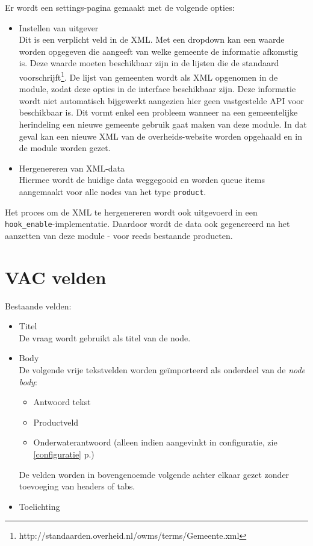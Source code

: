 \documentclass[12pt]{article}
\newcommand{\seeonec}[1]{, zie \ref{#1} p.\pageref{#1}}
\begin{document}
Er wordt een settings-pagina gemaakt met de volgende opties:
\begin{itemize}
\item Instellen van uitgever \\
Dit is een verplicht veld in de XML. Met een dropdown kan een waarde worden opgegeven die aangeeft van welke gemeente de informatie afkomstig is. Deze waarde moeten beschikbaar zijn in de lijsten die de standaard voorschrijft\footnote{http://standaarden.overheid.nl/owms/terms/Gemeente.xml}. De lijst van gemeenten wordt als XML opgenomen in de module, zodat deze opties in de interface beschikbaar zijn. Deze informatie wordt niet automatisch bijgewerkt aangezien hier geen vastgestelde API voor beschikbaar is. Dit vormt enkel een probleem wanneer na een gemeentelijke herindeling een nieuwe gemeente gebruik gaat maken van deze module. In dat geval kan een nieuwe XML van de overheids-website worden opgehaald en in de module worden gezet.  
\item Hergenereren van XML-data \\
Hiermee wordt de huidige data weggegooid en worden queue items aangemaakt voor alle nodes van het type \texttt{product}.
\end{itemize}

Het proces om de XML te hergenereren wordt ook uitgevoerd in een \texttt{hook\_enable}-implementatie. Daardoor wordt de data ook gegenereerd na het aanzetten van deze module - voor reeds bestaande producten.

\clearpage
\appendix
\appendixpage\label{appendices}
\addappheadtotoc


\section{VAC velden}
Bestaande velden:
\begin{itemize}
\item Titel \\ De vraag wordt gebruikt als titel van de node.
\item Body \\
De volgende vrije tekstvelden worden ge\"{i}mporteerd als onderdeel van de \emph{node body}:
\begin{itemize}
\item Antwoord tekst
\item Productveld
\item Onderwaterantwoord (alleen indien aangevinkt in configuratie\seeonec{configuratie})
\end{itemize}
De velden worden in bovengenoemde volgende achter elkaar gezet zonder toevoeging van headers of tabs.
\item Toelichting
\end{itemize}
\end{document}
